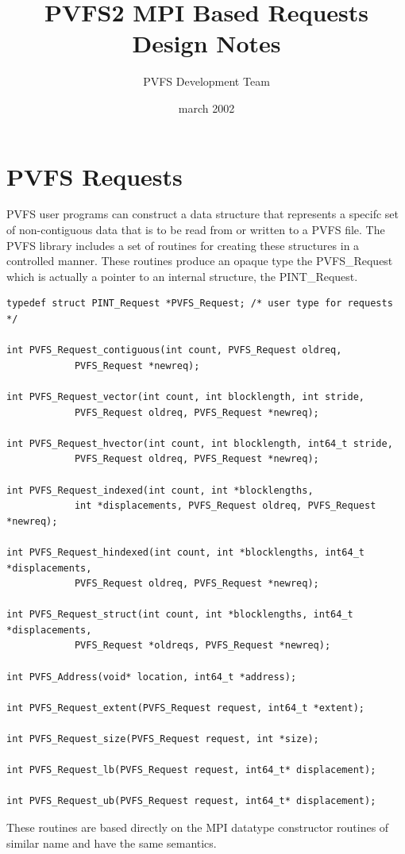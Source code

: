 \documentclass[12pt]{article} %
\title{PVFS2 MPI Based Requests\\ Design Notes}
\author{PVFS Development Team}
\date{march 2002}
\begin{document}
\maketitle

\section{PVFS Requests}

PVFS user programs can construct a data structure that represents a
specifc set of non-contiguous data that is to be read from or written to
a PVFS file.  The PVFS library includes a set of routines for creating
these structures in a controlled manner.  These routines produce an
opaque type the PVFS\_Request which is actually a pointer to an internal
structure, the PINT\_Request.

\begin{verbatim}
typedef struct PINT_Request *PVFS_Request; /* user type for requests */

int PVFS_Request_contiguous(int count, PVFS_Request oldreq,
            PVFS_Request *newreq);

int PVFS_Request_vector(int count, int blocklength, int stride,
            PVFS_Request oldreq, PVFS_Request *newreq);

int PVFS_Request_hvector(int count, int blocklength, int64_t stride,
            PVFS_Request oldreq, PVFS_Request *newreq);

int PVFS_Request_indexed(int count, int *blocklengths,
            int *displacements, PVFS_Request oldreq, PVFS_Request *newreq);

int PVFS_Request_hindexed(int count, int *blocklengths, int64_t *displacements,
            PVFS_Request oldreq, PVFS_Request *newreq);

int PVFS_Request_struct(int count, int *blocklengths, int64_t *displacements,
            PVFS_Request *oldreqs, PVFS_Request *newreq);

int PVFS_Address(void* location, int64_t *address);

int PVFS_Request_extent(PVFS_Request request, int64_t *extent);

int PVFS_Request_size(PVFS_Request request, int *size);

int PVFS_Request_lb(PVFS_Request request, int64_t* displacement);

int PVFS_Request_ub(PVFS_Request request, int64_t* displacement);
\end{verbatim}

These routines are based directly on the MPI datatype constructor routines
of similar name and have the same semantics.
\end{document}
